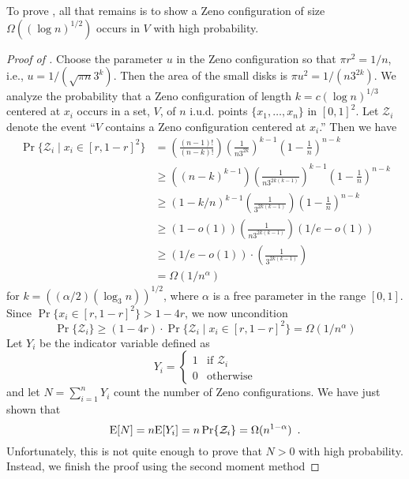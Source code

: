 \documentclass{patmorin}
\begin{document}
To prove , all that remains is to show a Zeno
configuration of size $\Omega((\log n)^{1/2})$ occurs in $V$ with high
probability.

\begin{proof}[Proof of ]
Choose the parameter $u$ in the Zeno configuration so that $\pi r^2=1/n$,
i.e., $u=1/(\sqrt{\pi n}3^k)$.  Then the area of the small disks is
$\pi u^2=1/(n3^{2k})$.
We analyze the probability that a Zeno configuration of length $k=c(\log
n)^{1/3}$ centered at $x_i$ occurs in a set, $V$, of $n$ i.u.d. points
$\{x_1,\ldots,x_n\}$ in
$[0,1]^2$.  Let $\mathcal{Z}_i$ denote the event ``$V$
contains a Zeno configuration centered at $x_i$.''  Then we have
\begin{align*}
 \Pr\{\mathcal{Z}_i\mid x_i\in[r,1-r]^2\} 
  & = \left(\frac{(n-1)!}{(n-k)!}\right) %
      \left(\frac{1}{n3^{2k}}\right)^{k-1}   %
      \left(1-\frac{1}{n}\right)^{n-k}   \\ %
  & \ge
      \left((n-k)^{k-1}\right) 
      \left(\frac{1}{n3^{2k(k-1)}}\right)^{k-1}  
      \left(1-\frac{1}{n}\right)^{n-k}   \\ 
  & \ge 
      (1-k/n)^{k-1} %
      \left(\frac{1}{3^{2k(k-1)}}\right)
      \left(1-\frac{1}{n}\right)^{n-k} \\
  & \ge
      \left(1-o(1)\right) 
      \left(\frac{1}{n3^{2k(k-1)}}\right)
      \left(1/e-o(1)\right)   \\ 
  & \ge (1/e-o(1)) \cdot \left(\frac{1}{3^{2k(k-1)}}\right) \\
  & = \Omega(1/n^{\alpha})
\end{align*}
for $k=((\alpha/2)(\log_3 n))^{1/2}$, where $\alpha$ is a free parameter in
the range $[0,1]$.  Since $\Pr\{x_i\in[r,1-r]^2\} > 1-4r$, we now
uncondition
\[
 \Pr\{\mathcal{Z}_i\} \ge  
    (1-4r)\cdot\Pr\{\mathcal{Z}_i\mid x_i\in[r,1-r]^2\}
    = \Omega(1/n^{\alpha})
\]
Let $Y_i$ be the indicator variable defined as
\[
   Y_i = \begin{cases} 1 & \text{if $\mathcal{Z}_i$} \\
                       0 & \text{otherwise} 
         \end{cases}
\]
and let $N=\sum_{i=1}^n Y_i$ count the number of Zeno configurations.  We
have just shown that 
\[
   \mathrm{E}[N] = n\mathrm{E}[Y_i] = n\Pr\{\mathcal{Z}_i\}=\Omega(n^{1-\alpha}) \enspace .
\]
Unfortunately, this is not quite enough to prove that $N>0$ with high
probability.  Instead, we finish the proof using the second moment method

\end{proof}
\end{document}
